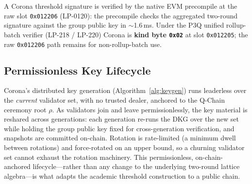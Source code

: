 A Corona threshold signature is verified by the native EVM precompile at the raw slot
\texttt{0x012206} (LP-0120): the precompile checks the aggregated two-round signature
against the group public key in $\sim$1.6\,ms. Under the P3Q unified rollup-batch verifier
(LP-218 / LP-220) Corona is \textbf{kind byte \texttt{0x02}} at slot \texttt{0x012205};
the raw \texttt{0x012206} path remains for non-rollup-batch use.

\subsection{Permissionless Key Lifecycle}

Corona's distributed key generation (Algorithm~\ref{alg:keygen}) runs leaderless over the
\emph{current} validator set, with no trusted dealer, anchored to the Q-Chain ceremony
root $\rho$. As validators join and leave permissionlessly, the key material is reshared
across generations: each generation re-runs the DKG over the new set while holding the
group public key fixed for cross-generation verification, and snapshots are committed
on-chain. Rotation is rate-limited (a minimum dwell between rotations) and force-rotated
on an upper bound, so a churning validator set cannot exhaust the rotation machinery.
This permissionless, on-chain-anchored lifecycle---rather than any change to the
underlying two-round lattice algebra---is what adapts the academic threshold construction
to a public chain.

